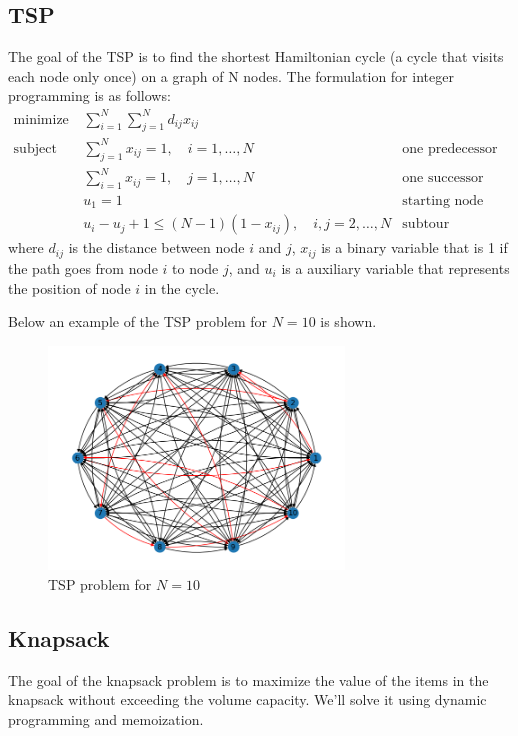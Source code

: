 \subsection{TSP}
The goal of the TSP is to find the shortest Hamiltonian cycle (a cycle that visits each node only once) on a graph of N nodes. The formulation for integer programming is as follows:
\begin{align*}
    \text{minimize}   & \sum_{i=1}^{N}\sum_{j=1}^{N}d_{ij}x_{ij}                &                            \\
    \text{subject to} & \sum_{j=1}^{N}x_{ij} = 1, \quad i=1,\ldots,N            & \text{one predecessor }    \\
                      & \sum_{i=1}^{N}x_{ij} = 1, \quad j=1,\ldots,N            & \text{one successor}       \\
                      & u_1 = 1                                                 & \text{starting node}       \\
                      & u_i - u_j +1 \leq (N-1)(1-x_{ij}), \quad i,j=2,\ldots,N & \text{subtour elimination}
\end{align*}
where $d_{ij}$ is the distance between node $i$ and $j$, $x_{ij}$ is a binary variable that is 1 if the path goes from node $i$ to node $j$, and $u_i$ is a auxiliary variable that represents the position of node $i$ in the cycle.

Below an example of the TSP problem for $N=10$ is shown.
\begin{figure}
    \centering
    \includegraphics[width=0.7\textwidth]{lab11/imgs/tsp.png}
    \caption{TSP problem for $N=10$}
    \label{fig:tsp}
\end{figure}

\subsection{Knapsack}
The goal of the knapsack problem is to maximize the value of the items in the knapsack without exceeding the volume capacity. We'll solve it using dynamic programming and memoization.

